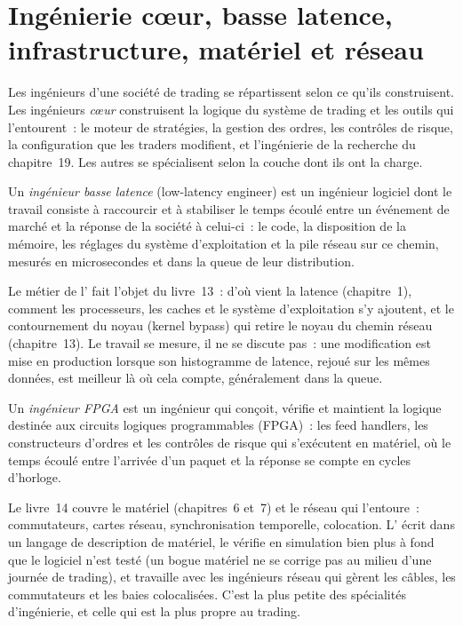 \section{Ingénierie cœur, basse latence, infrastructure, matériel et réseau}

Les ingénieurs d'une société de trading se répartissent selon ce qu'ils construisent. Les ingénieurs \emph{cœur} construisent la logique du système de trading et
les outils qui l'entourent~: le moteur de stratégies, la gestion des ordres, les contrôles de risque, la configuration que les traders modifient, et l'ingénierie
de la recherche du chapitre~19. Les autres se spécialisent selon la couche dont ils ont la charge.

\begin{definition}\label{def:in:software-engineer:lowlat}
Un \emph{ingénieur basse latence} (low-latency engineer) est un ingénieur logiciel dont le travail consiste à raccourcir et à stabiliser le
temps écoulé entre un événement de marché et la réponse de la société à celui-ci~: le code, la disposition de la mémoire, les réglages du système d'exploitation
et la pile réseau sur ce chemin, mesurés en microsecondes et dans la queue de leur distribution.
\end{definition}

Le métier de l' fait l'objet du livre~13~: d'où vient la latence (chapitre~1), comment les processeurs, les caches
et le système d'exploitation s'y ajoutent, et le contournement du noyau (kernel bypass) qui retire le noyau du chemin réseau (chapitre~13).
Le travail se mesure, il ne se discute pas~: une modification est mise en production lorsque son histogramme de latence, rejoué sur les mêmes données, est meilleur
là où cela compte, généralement dans la queue.

\begin{definition}\label{def:in:software-engineer:fpga}
Un \emph{ingénieur FPGA} est un ingénieur qui conçoit, vérifie et maintient la logique destinée aux
circuits logiques programmables (FPGA)~: les feed handlers, les constructeurs d'ordres et les contrôles de risque qui
s'exécutent en matériel, où le temps écoulé entre l'arrivée d'un paquet et la réponse se compte en cycles d'horloge.
\end{definition}

Le livre~14 couvre le matériel (chapitres~6 et~7) et le réseau qui l'entoure~: commutateurs, cartes réseau, synchronisation
temporelle, colocation. L' écrit dans un langage de description de matériel, le vérifie en simulation bien plus à fond
que le logiciel n'est testé (un bogue matériel ne se corrige pas au milieu d'une journée de trading), et travaille avec
les ingénieurs réseau qui gèrent les câbles, les commutateurs et les baies colocalisées. C'est la plus petite des spécialités
d'ingénierie, et celle qui est la plus propre au trading.

